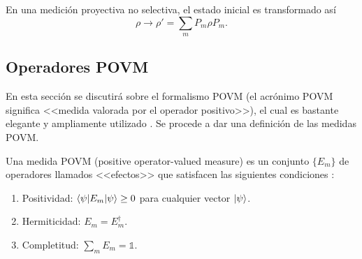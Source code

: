  En una medición proyectiva no selectiva, el estado inicial es transformado así
\begin{equation}
	\rho \to \rho'=\sum_m P_m \rho P_m.
\end{equation} 
\subsection{Operadores POVM}\label{subsec:operadoresPOVM} %


En esta sección se discutirá sobre el formalismo POVM (el acrónimo POVM significa <<medida valorada por el operador positivo>>), el cual es bastante elegante y ampliamente utilizado {\cite{nielsen_chuang_2010}}. Se procede a dar una definición de las medidas POVM\@. 

\begin{definition} Una medida POVM (positive operator-valued measure) es un conjunto $\{E_{m}\}$ de operadores llamados <<efectos>> que satisfacen las siguientes condiciones {\cite{2007geometry}}:
	\begin{enumerate}
		\item Positividad: $\langle \psi |E_m|\psi \rangle \ge 0 $ para cualquier vector $|\psi\rangle$.
		\item Hermiticidad: $E_m=E_{m}^\dagger$.
		\item  Completitud: $\sum_m E_m =\mathds{1}$.
	\end{enumerate}
\end{definition}

